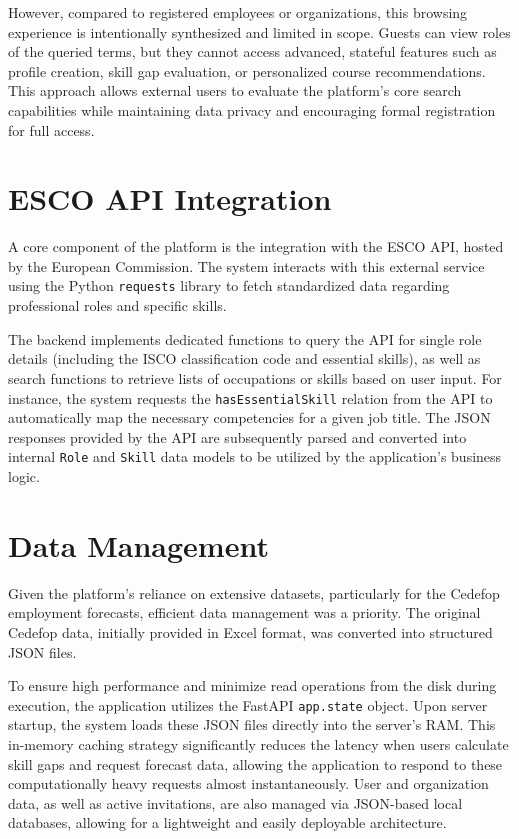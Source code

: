 \documentclass{article}
\begin{document}
However, compared to registered employees or organizations, this browsing experience 
is intentionally synthesized and limited in scope. Guests can view roles 
of the queried terms, but they cannot access 
advanced, stateful features such as profile creation, skill gap evaluation, or 
personalized course recommendations. This approach allows external users to evaluate 
the platform's core search capabilities while maintaining data privacy and 
encouraging formal registration for full access.

\newpage

\section{ESCO API Integration}
A core component of the platform is the integration with the ESCO API, hosted by 
the European Commission. The system interacts with this external service using the 
Python \texttt{requests} library to fetch standardized data regarding professional 
roles and specific skills.

The backend implements dedicated functions to query the API for single role 
details (including the ISCO classification code and essential skills), 
as well as search functions to retrieve lists of occupations or skills based 
on user input. For instance, the system requests the \texttt{hasEssentialSkill} 
relation from the API to automatically map the necessary competencies for a given 
job title. The JSON responses provided by the API are subsequently parsed and 
converted into internal \texttt{Role} and \texttt{Skill} data models to be utilized 
by the application's business logic.

\section{Data Management}
Given the platform's reliance on extensive datasets, particularly for the Cedefop 
employment forecasts, efficient data management was a priority. The original Cedefop 
data, initially provided in Excel format, was converted into structured JSON files. 

To ensure high performance and minimize read operations from the disk during 
execution, the application utilizes the FastAPI \texttt{app.state} object. 
Upon server startup, the system loads these JSON files directly into the server's RAM. 
This in-memory caching strategy significantly reduces the latency when users calculate 
skill gaps and request forecast data, allowing the application to respond to these 
computationally heavy requests almost instantaneously. User and organization data, 
as well as active invitations, are also managed via JSON-based local databases, 
allowing for a lightweight and easily deployable architecture.
\end{document}
